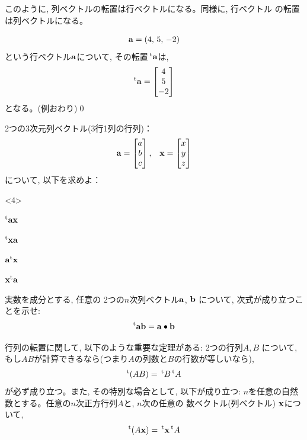 このように, 列ベクトルの転置は行ベクトルになる。同様に, 行ベクトル
の転置は列ベクトルになる。

\begin{exmpl}
\begin{eqnarray}{\bf a}=(4,\,5,\,-2)\label{eq:rowvectsample1}\end{eqnarray}
という行ベクトル${\bf a}$について, その転置$\,^{\text t}{\bf a}$は, 
\begin{eqnarray}^{\text t}{\bf a}=\begin{bmatrix}
4\\ 5\\ -2
\end{bmatrix}\label{eq:colvectsample2}\end{eqnarray}
となる。(例おわり)\qed\end{exmpl}
\mv

\begin{q}\label{q:linear2_40} 2つの3次元列ベクトル(3行1列の行列)：
\begin{eqnarray}{\bf a}=
\begin{bmatrix}
a\\ b\\ c
\end{bmatrix},\,\,\,\,\,
{\bf x}=
\begin{bmatrix}
x\\ y\\ z
\end{bmatrix}
\label{eq:colvectsample3}
\end{eqnarray}
について, 以下を求めよ：
\begin{edaenumerate}<4>
\item $^{\text t}{\bf a}{\bf x}$
\item $^{\text t}{\bf x}{\bf a}$
\item ${\bf a}^{\text t}{\bf x}$
\item ${\bf x}^{\text t}{\bf a}$
\end{edaenumerate}\end{q}
\mv

\begin{q}\label{q:transpose_inprod} 実数を成分とする, 任意の
2つの$n$次列ベクトル${\bf a}$, ${\bf b}$
について, 次式が成り立つことを示せ:
\begin{eqnarray}
^{\text t}{\bf a}{\bf b}={\bf a}\bullet{\bf b}
\end{eqnarray}
\end{q}
\mv

行列の転置に関して, 以下のような重要な定理がある: 2つの行列$A, B$
について, もし$AB$が計算できるなら(つまり$A$の列数と$B$の行数が等しいなら), 
\begin{eqnarray}
^{\text t}(AB)=\,^{\text t}B\,^{\text t}A\label{eq:matrix_trans_prod02}
\end{eqnarray}
が必ず成り立つ。また, その特別な場合として, 以下が成り立つ: 
$n$を任意の自然数とする。任意の$n$次正方行列$A$と, $n$次の任意の
数ベクトル(列ベクトル) ${\bf x}$について,
\begin{eqnarray}
^{\text t}(A{\bf x})=\,^{\text t}{\bf x}\,^{\text t}A\label{eq:tAx_txtA}
\end{eqnarray}

